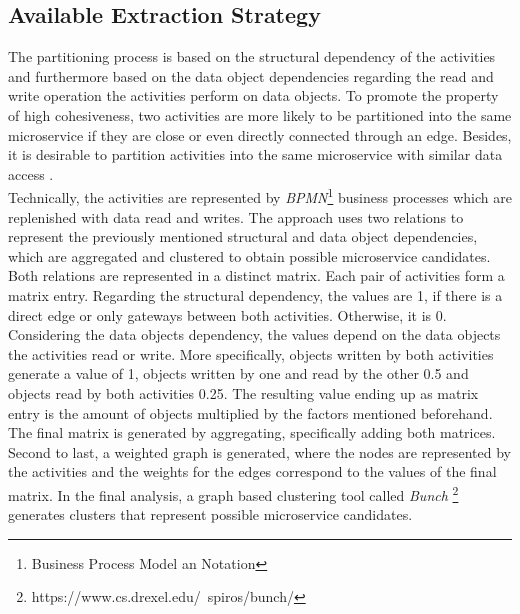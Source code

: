 \subsection{Available Extraction Strategy}
\label{sec:solutionOverview:basicStrategy}
The partitioning process is based on the structural dependency of the activities and furthermore based on the data object dependencies regarding the read and write operation the activities perform on data objects. To promote the property of high cohesiveness, two activities are more likely to be partitioned into the same microservice if they are close or even directly connected through an edge. Besides, it is desirable to partition activities into the same microservice with similar data access . \\
Technically, the activities are represented by \textit{BPMN}\footnote{Business Process Model an Notation} business processes which are replenished with data read and writes. The approach uses two relations to represent the previously mentioned structural and data object dependencies, which are aggregated and clustered to obtain possible microservice candidates. \\
Both relations are represented in a distinct matrix. Each pair of activities form a matrix entry.
Regarding the structural dependency, the values are 1, if there is a direct edge or only gateways between both activities. Otherwise, it is 0. Considering the data objects dependency, the values depend on the data objects the activities read or write. More specifically, objects written by both activities generate a value of 1, objects written by one and read by the other 0.5 and objects read by both activities 0.25. The resulting value ending up as matrix entry is the amount of objects multiplied by the factors mentioned beforehand.\\
The final matrix is generated by aggregating, specifically adding both matrices. Second to last, a weighted graph is generated, where the nodes are represented by the activities and the weights for the edges correspond to the values of the final matrix. In the final analysis, a graph based clustering tool called \textit{Bunch} \footnote{https://www.cs.drexel.edu/~spiros/bunch/} generates clusters that represent possible microservice candidates.

